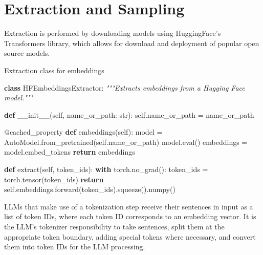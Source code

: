 \documentclass[
  a4paper, twoside, 10pt, titlepage]{book}
\newenvironment{Shaded}{}{}
\newcommand{\AttributeTok}[1]{\textcolor[rgb]{0.49,0.56,0.16}{#1}}
\newcommand{\BuiltInTok}[1]{\textcolor[rgb]{0.00,0.50,0.00}{#1}}
\newcommand{\CommentTok}[1]{\textcolor[rgb]{0.38,0.63,0.69}{\textit{#1}}}
\newcommand{\ControlFlowTok}[1]{\textcolor[rgb]{0.00,0.44,0.13}{\textbf{#1}}}
\newcommand{\FunctionTok}[1]{\textcolor[rgb]{0.02,0.16,0.49}{#1}}
\newcommand{\KeywordTok}[1]{\textcolor[rgb]{0.00,0.44,0.13}{\textbf{#1}}}
\newcommand{\NormalTok}[1]{#1}
\newcommand{\OperatorTok}[1]{\textcolor[rgb]{0.40,0.40,0.40}{#1}}
\newcommand{\VariableTok}[1]{\textcolor[rgb]{0.10,0.09,0.49}{#1}}
\begin{document}
\clearpage

\section{Extraction and Sampling}\label{extraction-and-sampling}

Extraction is performed by downloading models using HuggingFace's
Transformers library, which allows for download and deployment of
popular open source models.

\begin{codelisting}

\caption{Extraction class for embeddings}\label{lst:extractor}

\begin{Shaded}
\begin{Highlighting}[]
\KeywordTok{class}\NormalTok{ HFEmbeddingsExtractor:}
    \CommentTok{"""Extracts embeddings from a Hugging Face model."""}

    \KeywordTok{def} \FunctionTok{\_\_init\_\_}\NormalTok{(}\VariableTok{self}\NormalTok{, name\_or\_path: }\BuiltInTok{str}\NormalTok{):}
        \VariableTok{self}\NormalTok{.name\_or\_path }\OperatorTok{=}\NormalTok{ name\_or\_path}

    \AttributeTok{@cached\_property}
    \KeywordTok{def}\NormalTok{ embeddings(}\VariableTok{self}\NormalTok{):}
\NormalTok{        model }\OperatorTok{=}\NormalTok{ AutoModel.from\_pretrained(}\VariableTok{self}\NormalTok{.name\_or\_path)}
\NormalTok{        model.}\BuiltInTok{eval}\NormalTok{()}
\NormalTok{        embeddings }\OperatorTok{=}\NormalTok{ model.embed\_tokens}
        \ControlFlowTok{return}\NormalTok{ embeddings}

    \KeywordTok{def}\NormalTok{ extract(}\VariableTok{self}\NormalTok{, token\_ids):}
        \ControlFlowTok{with}\NormalTok{ torch.no\_grad():}
\NormalTok{            token\_ids }\OperatorTok{=}\NormalTok{ torch.tensor(token\_ids)}
            \ControlFlowTok{return} \VariableTok{self}\NormalTok{.embeddings.forward(token\_ids).squeeze().numpy()}
\end{Highlighting}
\end{Shaded}

\end{codelisting}

LLMs that make use of a tokenization step receive their sentences in
input as a list of token IDs, where each token ID corresponds to an
embedding vector. It is the LLM's tokenizer responsibility to take
sentences, split them at the appropriate token boundary, adding special
tokens where necessary, and convert them into token IDs for the LLM
processing.
\end{document}

